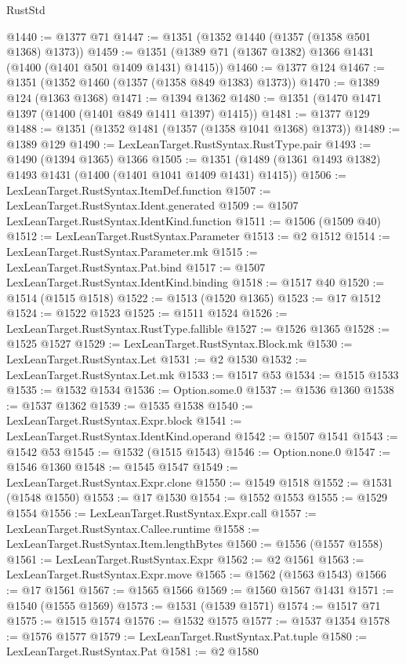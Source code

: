 \begin{lexlean}{RustStd}
\begin{coremodule}
@1440 := @1377 @71
@1447 := @1351 (@1352 @1440 (@1357 (@1358 @501 @1368) @1373))
@1459 := @1351 (@1389 @71 (@1367 @1382) @1366 @1431 (@1400 (@1401 @501 @1409 @1431) @1415))
@1460 := @1377 @124
@1467 := @1351 (@1352 @1460 (@1357 (@1358 @849 @1383) @1373))
@1470 := @1389 @124 (@1363 @1368)
@1471 := @1394 @1362
@1480 := @1351 (@1470 @1471 @1397 (@1400 (@1401 @849 @1411 @1397) @1415))
@1481 := @1377 @129
@1488 := @1351 (@1352 @1481 (@1357 (@1358 @1041 @1368) @1373))
@1489 := @1389 @129
@1490 := LexLeanTarget.RustSyntax.RustType.pair
@1493 := @1490 (@1394 @1365) @1366
@1505 := @1351 (@1489 (@1361 @1493 @1382) @1493 @1431 (@1400 (@1401 @1041 @1409 @1431) @1415))
@1506 := LexLeanTarget.RustSyntax.ItemDef.function
@1507 := LexLeanTarget.RustSyntax.Ident.generated
@1509 := @1507 LexLeanTarget.RustSyntax.IdentKind.function
@1511 := @1506 (@1509 @40)
@1512 := LexLeanTarget.RustSyntax.Parameter
@1513 := @2 @1512
@1514 := LexLeanTarget.RustSyntax.Parameter.mk
@1515 := LexLeanTarget.RustSyntax.Pat.bind
@1517 := @1507 LexLeanTarget.RustSyntax.IdentKind.binding
@1518 := @1517 @40
@1520 := @1514 (@1515 @1518)
@1522 := @1513 (@1520 @1365)
@1523 := @17 @1512
@1524 := @1522 @1523
@1525 := @1511 @1524
@1526 := LexLeanTarget.RustSyntax.RustType.fallible
@1527 := @1526 @1365
@1528 := @1525 @1527
@1529 := LexLeanTarget.RustSyntax.Block.mk
@1530 := LexLeanTarget.RustSyntax.Let
@1531 := @2 @1530
@1532 := LexLeanTarget.RustSyntax.Let.mk
@1533 := @1517 @53
@1534 := @1515 @1533
@1535 := @1532 @1534
@1536 := Option.some.{0}
@1537 := @1536 @1360
@1538 := @1537 @1362
@1539 := @1535 @1538
@1540 := LexLeanTarget.RustSyntax.Expr.block
@1541 := LexLeanTarget.RustSyntax.IdentKind.operand
@1542 := @1507 @1541
@1543 := @1542 @53
@1545 := @1532 (@1515 @1543)
@1546 := Option.none.{0}
@1547 := @1546 @1360
@1548 := @1545 @1547
@1549 := LexLeanTarget.RustSyntax.Expr.clone
@1550 := @1549 @1518
@1552 := @1531 (@1548 @1550)
@1553 := @17 @1530
@1554 := @1552 @1553
@1555 := @1529 @1554
@1556 := LexLeanTarget.RustSyntax.Expr.call
@1557 := LexLeanTarget.RustSyntax.Callee.runtime
@1558 := LexLeanTarget.RustSyntax.Item.lengthBytes
@1560 := @1556 (@1557 @1558)
@1561 := LexLeanTarget.RustSyntax.Expr
@1562 := @2 @1561
@1563 := LexLeanTarget.RustSyntax.Expr.move
@1565 := @1562 (@1563 @1543)
@1566 := @17 @1561
@1567 := @1565 @1566
@1569 := @1560 @1567 @1431
@1571 := @1540 (@1555 @1569)
@1573 := @1531 (@1539 @1571)
@1574 := @1517 @71
@1575 := @1515 @1574
@1576 := @1532 @1575
@1577 := @1537 @1354
@1578 := @1576 @1577
@1579 := LexLeanTarget.RustSyntax.Pat.tuple
@1580 := LexLeanTarget.RustSyntax.Pat
@1581 := @2 @1580

\end{coremodule}
\end{lexlean}
